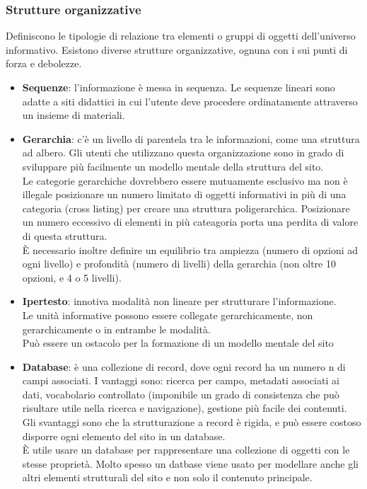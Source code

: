 \documentclass{article}
\begin{document}
\subsubsection{Strutture organizzative}
Definiscono le tipologie di relazione tra elementi o gruppi di oggetti dell'universo informativo. Esistono diverse strutture organizzative, ognuna con i sui punti di forza e debolezze.
\begin{itemize}
	\item \textbf{Sequenze}: l'informazione è messa in sequenza. Le sequenze lineari sono adatte a siti didattici in cui l'utente deve procedere ordinatamente attraverso un insieme di materiali.
	\item \textbf{Gerarchia}: c'è un livello di parentela tra le informazioni, come una struttura ad albero. Gli utenti che utilizzano questa organizzazione sono in grado di sviluppare più facilmente un modello mentale della struttura del sito.\\
	Le categorie gerarchiche dovrebbero essere mutuamente esclusivo ma non è illegale posizionare un numero limitato di oggetti informativi in più di una categoria (cross listing) per creare una struttura poligerarchica. Posizionare un numero eccessivo di elementi in più cateagoria porta una perdita di valore di questa struttura.\\
	È necessario inoltre definire un equilibrio tra ampiezza (numero di opzioni ad ogni livello) e profondità (numero di livelli) della gerarchia (non oltre 10 opzioni, e 4 o 5 livelli).
	\item \textbf{Ipertesto}: innotiva modalità non lineare per strutturare l'informazione.\\
	Le unità informative possono essere collegate gerarchicamente, non gerarchicamente o in entrambe le modalità.\\ Può essere un ostacolo per la formazione di un modello mentale del sito 
	\item \textbf{Database}: è una collezione di record, dove ogni record ha un numero n di campi associati. I vantaggi sono: ricerca per campo, metadati associati ai dati, vocabolario controllato (imponibile un grado di consistenza che può risultare utile nella ricerca e navigazione), gestione più facile dei contenuti. Gli svantaggi sono che la strutturazione a record è rigida, e può essere costoso disporre ogni elemento del sito in un database.\\
	È utile usare un database per rappresentare una collezione di oggetti con le stesse proprietà. Molto spesso un datbase viene usato per modellare anche gli altri elementi strutturali del sito e non solo il contenuto principale.
\end{itemize}
\end{document}
